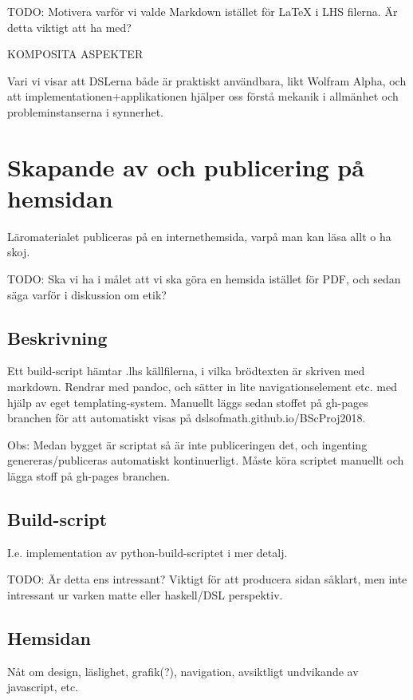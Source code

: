 \begin{binge}
TODO: Motivera varför vi valde Markdown istället för LaTeX i LHS filerna. Är detta viktigt att ha med?

KOMPOSITA ASPEKTER

Vari vi visar att DSLerna både är praktiskt användbara, likt Wolfram
Alpha, och att implementationen+applikationen hjälper oss förstå
mekanik i allmänhet och probleminstanserna i synnerhet.

\section{Skapande av och publicering på hemsidan}

  Läromaterialet publiceras på en internethemsida, varpå man kan läsa
  allt o ha skoj.

TODO: Ska vi ha i målet att vi ska göra en hemsida istället för PDF, och sedan säga varför i diskussion om etik?

  \subsection{Beskrivning}

  Ett build-script hämtar .lhs källfilerna, i vilka brödtexten är
  skriven med markdown. Rendrar med pandoc, och sätter in lite
  navigationselement etc. med hjälp av eget templating-system. Manuellt
  läggs sedan stoffet på gh-pages branchen för att automatiskt visas på
  dslsofmath.github.io/BScProj2018.

  Obs: Medan bygget är scriptat så är inte publiceringen det, och
  ingenting genereras/publiceras automatiskt kontinuerligt. Måste köra
  scriptet manuellt och lägga stoff på gh-pages branchen.

  \subsection{Build-script}

  I.e. implementation av python-build-scriptet i mer detalj.

  TODO: Är detta ens intressant? Viktigt för att producera sidan såklart, men
  inte intressant ur varken matte eller haskell/DSL perspektiv.

  \subsection{Hemsidan}

  Nåt om design, läslighet, grafik(?), navigation, avsiktligt undvikande
  av javascript, etc.


\end{binge}
